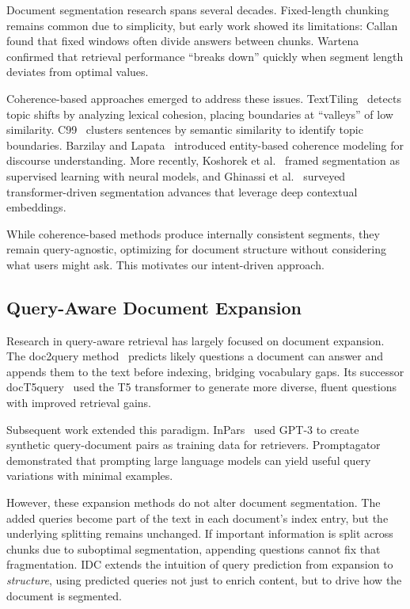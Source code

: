 \documentclass[conference]{IEEEtran}
\begin{document}
Document segmentation research spans several decades. Fixed-length chunking remains common due to simplicity, but early work showed its limitations: Callan~\cite{callan1994passage} found that fixed windows often divide answers between chunks. Wartena~\cite{wartena2013segmentation} confirmed that retrieval performance ``breaks down'' quickly when segment length deviates from optimal values.

Coherence-based approaches emerged to address these issues. TextTiling~\cite{hearst1997texttiling} detects topic shifts by analyzing lexical cohesion, placing boundaries at ``valleys'' of low similarity. C99~\cite{choi2000advances} clusters sentences by semantic similarity to identify topic boundaries. Barzilay and Lapata~\cite{barzilay2008modeling} introduced entity-based coherence modeling for discourse understanding. More recently, Koshorek et al.~\cite{koshorek2018text} framed segmentation as supervised learning with neural models, and Ghinassi et al.~\cite{ghinassi2024recent} surveyed transformer-driven segmentation advances that leverage deep contextual embeddings.

While coherence-based methods produce internally consistent segments, they remain query-agnostic, optimizing for document structure without considering what users might ask. This motivates our intent-driven approach.

\subsection{Query-Aware Document Expansion}

Research in query-aware retrieval has largely focused on document expansion. The doc2query method~\cite{nogueira2019document} predicts likely questions a document can answer and appends them to the text before indexing, bridging vocabulary gaps. Its successor docT5query~\cite{nogueira2019doctttttquery} used the T5 transformer to generate more diverse, fluent questions with improved retrieval gains.

Subsequent work extended this paradigm. InPars~\cite{bonifacio2022inpars} used GPT-3 to create synthetic query-document pairs as training data for retrievers. Promptagator~\cite{dai2022promptagator} demonstrated that prompting large language models can yield useful query variations with minimal examples.

However, these expansion methods do not alter document segmentation. The added queries become part of the text in each document's index entry, but the underlying splitting remains unchanged. If important information is split across chunks due to suboptimal segmentation, appending questions cannot fix that fragmentation. IDC extends the intuition of query prediction from expansion to \textit{structure}, using predicted queries not just to enrich content, but to drive how the document is segmented.
\end{document}

